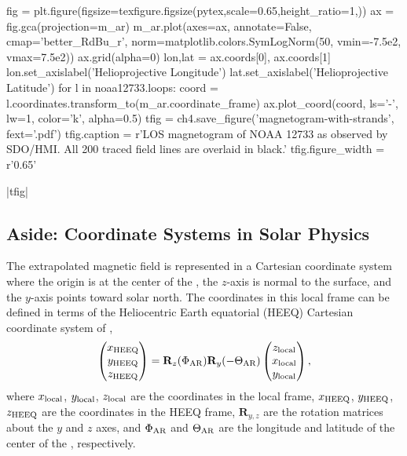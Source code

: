 \begin{pycode}[chapter4]
fig = plt.figure(figsize=texfigure.figsize(pytex,scale=0.65,height_ratio=1,))
ax = fig.gca(projection=m_ar)
m_ar.plot(axes=ax, annotate=False, cmap='better_RdBu_r',
          norm=matplotlib.colors.SymLogNorm(50, vmin=-7.5e2, vmax=7.5e2))
ax.grid(alpha=0)
lon,lat = ax.coords[0], ax.coords[1]
lon.set_axislabel('Helioprojective Longitude')
lat.set_axislabel('Helioprojective Latitude')
for l in noaa12733.loops:
    coord = l.coordinates.transform_to(m_ar.coordinate_frame)
    ax.plot_coord(coord, ls='-', lw=1, color='k', alpha=0.5)
tfig = ch4.save_figure('magnetogram-with-strands', fext='.pdf')
tfig.caption = r'LOS magnetogram of NOAA 12733 as observed by SDO/HMI. All 200 traced field lines are overlaid in black.'
tfig.figure_width = r'0.65\textwidth'
\end{pycode}
\py[chapter4]|tfig|

\subsection{Aside: Coordinate Systems in Solar Physics}\label{sec:coordinates}

The extrapolated magnetic field is represented in a Cartesian coordinate system where the origin is at the center of the \AR{}, the $z$-axis is normal to the surface, and the $y$-axis points toward solar north. The coordinates in this local \AR{} frame can be defined in terms of the Heliocentric Earth equatorial (HEEQ) Cartesian coordinate system of \citet{hapgood_space_1992},
\begin{equation}\label{eq:local_heeq_transform}
    \begin{pmatrix}x_\textup{HEEQ} \\ y_\textup{HEEQ} \\ z_\textup{HEEQ}\end{pmatrix}
    = \mathbf{R}_z(\Phi_\textup{AR})\mathbf{R}_y(-\Theta_\textup{AR})
    \begin{pmatrix}z_\textup{local} \\ x_\textup{local} \\ y_\textup{local}\end{pmatrix},
\end{equation}
where $x_\textup{local}$, $y_\textup{local}$, $z_\textup{local}$ are the coordinates in the local \AR{} frame, $x_\textup{HEEQ}$, $y_\textup{HEEQ}$, $z_\textup{HEEQ}$ are the coordinates in the HEEQ frame, $\mathbf{R}_{y,z}$ are the rotation matrices about the $y$ and $z$ axes, and $\Phi_\textup{AR}$ and $\Theta_\textup{AR}$ are the longitude and latitude of the center of the \AR{}, respectively.

